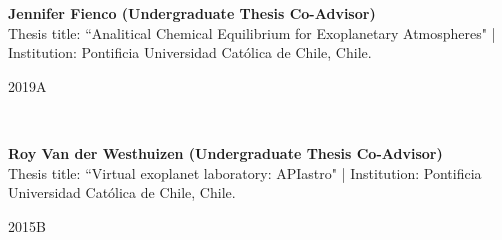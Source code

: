 \documentclass[12pt, a4paper]{article} %
\begin{document}
\begin{minipage}[t]{0.7\textwidth}
\begin{flushleft}%
  \setlength{\leftskip}{0.2cm}%
\textbf{Jennifer Fienco (Undergraduate Thesis Co-Advisor)}\\
Thesis title: ``Analitical Chemical Equilibrium for Exoplanetary Atmospheres" | Institution: Pontificia Universidad Cat\'olica de Chile, Chile.
\end{flushleft}
\end{minipage}
\begin{minipage}[t]{0.3\textwidth}
\hfill 2019A
\end{minipage}\\

\begin{minipage}[t]{0.7\textwidth}
\begin{flushleft}%
  \setlength{\leftskip}{0.2cm}%
\textbf{Roy Van der Westhuizen (Undergraduate Thesis Co-Advisor)}\\
Thesis title: ``Virtual exoplanet laboratory: APIastro" | Institution: Pontificia Universidad Cat\'olica de Chile, Chile.
\end{flushleft}
\end{minipage}
\begin{minipage}[t]{0.3\textwidth}
\hfill 2015B
\end{minipage}
\end{document}
